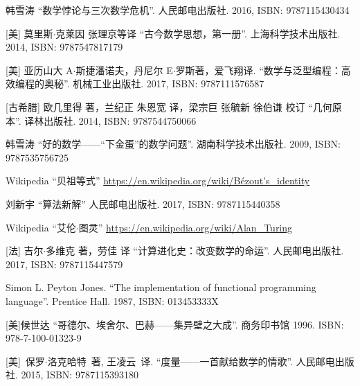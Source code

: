 \documentclass[b5paper]{ctexart}
\begin{document}
\begin{thebibliography}{99}

韩雪涛 ``数学悖论与三次数学危机''. 人民邮电出版社. 2016, ISBN: 9787115430434

[美] 莫里斯$\cdot$克莱因 张理京等译 ``古今数学思想，第一册''. 上海科学技术出版社. 2014, ISBN: 9787547817179

[美] 亚历山大 A$\cdot$斯捷潘诺夫，丹尼尔 E$\cdot$罗斯著，爱飞翔译. ``数学与泛型编程：高效编程的奥秘''. 机械工业出版社. 2017, ISBN: 9787111576587

[古希腊] 欧几里得 著，兰纪正 朱恩宽 译，梁宗巨 张毓新 徐伯谦 校订 ``几何原本''. 译林出版社. 2014, ISBN: 9787544750066

韩雪涛 ``好的数学——“下金蛋”的数学问题''. 湖南科学技术出版社. 2009, ISBN: 9787535756725

Wikipedia ``贝祖等式'' \url{https://en.wikipedia.org/wiki/Bézout's_identity}

刘新宇 ``算法新解'' 人民邮电出版社. 2017, ISBN: 9787115440358

Wikipedia ``艾伦$\cdot$图灵'' \url{https://en.wikipedia.org/wiki/Alan_Turing}

[法] 吉尔$\cdot$多维克 著，劳佳 译 ``计算进化史：改变数学的命运''. 人民邮电出版社. 2017, ISBN: 9787115447579

Simon L. Peyton Jones. ``The implementation of functional programming language''. Prentice Hall. 1987, ISBN: 013453333X

[美]候世达 ``哥德尔、埃舍尔、巴赫——集异壁之大成''. 商务印书馆 1996. ISBN: 978-7-100-01323-9

[美]\ 保罗$\cdot$洛克哈特\ 著, 王凌云\ 译. ``度量——一首献给数学的情歌''. 人民邮电出版社. 2015, ISBN: 9787115393180

\end{thebibliography}

\expandafter\enddocument

\fi
\end{document}

